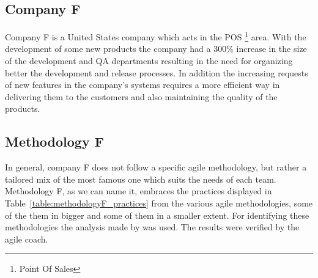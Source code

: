 \subsection{Company F}
Company F is a United States company which acts in the POS \footnote{Point Of Sales} area. With the development of some new products the company had a 300\% increase in the size of the development and QA departments resulting in the need for organizing better the development and release processes. In addition the increasing requests of new features in the company's systems requires a more efficient way in delivering them to the customers and also maintaining the quality of the products.

\subsection{Methodology F}
In general, company F does not follow a specific agile methodology, but rather a tailored mix of the most famous one which suits the needs of each team. Methodology F, as we can name it, embraces the practices displayed in Table~\ref{table:methodologyF_practices} from the various agile methodologies, some of the them in bigger and some of them in a smaller extent. For identifying these methodologies the analysis made by \cite{koch2005agile} was used. The results were verified by the agile coach.

